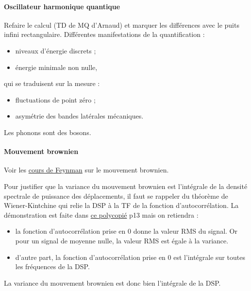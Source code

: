 \documentclass[12pt,a4paper]{article}
\begin{document}
\paragraph{Oscillateur harmonique quantique\\}
Refaire le calcul (TD de MQ d'Arnaud) et marquer les différences avec le puits infini rectangulaire.
Différentes manifestations de la quantification :
\begin{itemize}
\item niveaux d'énergie discrets ;
\item énergie minimale non nulle,
\end{itemize}
qui se traduisent sur la mesure :
\begin{itemize}
\item fluctuations de point zéro ;
\item asymétrie des bandes latérales mécaniques.
\end{itemize}

Les phonons sont des bosons.

\paragraph{Mouvement brownien\\}
Voir les \href{https://www.feynmanlectures.caltech.edu/I_41.html}{cours de Feynman} sur le mouvement brownien.

Pour justifier que la variance du mouvement brownien est l'intégrale de la densité spectrale de puissance des déplacements, il faut se rappeler du théorème de Wiener-Kintchine qui relie la DSP à la TF de la fonction d'autocorrélation.
La démonstration est faite dans \href{https://www.google.com/url?sa=t&rct=j&q=&esrc=s&source=web&cd=&ved=2ahUKEwiH3r61hPXpAhUMkRQKHW_3DH0QFjACegQIAxAB&url=http\%3A\%2F\%2Fwww.dalembert.upmc.fr\%2Fhome\%2Follivier\%2Fimages\%2FDocumentsPeda\%2F4AA06_SigAleat_SystLin_1314.pdf&usg=AOvVaw0JdnroUtcqr9KC1VxnqGSz}{ce polycopié} p13 mais on retiendra :
\begin{itemize}
\item la fonction d'autocorrélation prise en 0 donne la valeur RMS du signal.
Or pour un signal de moyenne nulle, la valeur RMS est égale à la variance.
\item d'autre part, la fonction d'autocorrélation prise en 0 est l'intégrale sur toutes les fréquences de la DSP.
\end{itemize}
La variance du mouvement brownien est donc bien l'intégrale de la DSP.
\end{document}

